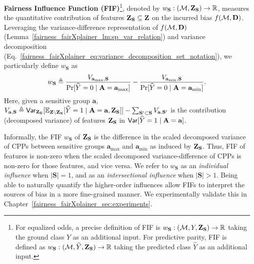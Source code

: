\begin{definition} \textbf{Fairness Influence Function (FIF)}\footnote{For equalized odds, a precise definition of FIF is $ w_{\mathbf{S}}: (\mathcal{M}, Y, \mathbf{Z}_{\mathbf{S}}) \rightarrow \mathbb{R} $ taking the ground class $ Y $ as an additional input. For predictive parity, FIF is defined as $ w_{\mathbf{S}}: (\mathcal{M}, \widehat{Y}, \mathbf{Z}_{\mathbf{S}}) \rightarrow \mathbb{R} $ taking the predicted class $ \widehat{Y} $ as an additional input.}, denoted by $ w_{\mathbf{S}}: (\mathcal{M}, \mathbf{Z}_{\mathbf{S}}) \rightarrow \mathbb{R} $, measures the quantitative contribution of features $ \mathbf{Z}_{\mathbf{S}} \subseteq \mathbf{Z} $ on the incurred bias $ f(\mathcal{M}, \mathbf{D}) $. Leveraging the variance-difference representation of $ f(\mathcal{M}, \mathbf{D}) $ (Lemma~\ref{fairness_fairXplainer_lm:sp_var_relation}) and variance decomposition (Eq.~\eqref{fairness_fairXplainer_eq:variance_decomposition_set_notation}), we particularly define $ w_{\mathbf{S}} $ as
\begin{equation}\label{fairness_fairXplainer_eq:fif_decompose}
	w_{\mathbf{S}}  \triangleq \frac{V_{\mathbf{a}_{\max}, \mathbf{S}}}{ \Pr[\widehat{Y} = 0 \mid  \mathbf{A} = \mathbf{a}_{\max}]} - \frac{V_{\mathbf{a}_{\min}, \mathbf{S}} }{\Pr[\widehat{Y} = 0 \mid  \mathbf{A} = \mathbf{a}_{\min}]}.
\end{equation}
Here, given a sensitive group $ \mathbf{a} $, $ V_{\mathbf{a}, \mathbf{S}} \triangleq  \mathsf{Var} _{\mathbf{Z}_{\mathbf{S}}}[\mathbb{E}_{\mathbf{Z}\setminus\mathbf{Z}_{\mathbf{S}}}[\widehat{Y} = 1\mid \mathbf{A} = \mathbf{a}, \mathbf{Z}_{\mathbf{S}}]]- \sum_{\mathbf{S}' \subset \mathbf{S}}{V} _{\mathbf{a}, \mathbf{S}'} $ is the contribution (decomposed variance) of features $ \mathbf{Z}_{\mathbf{S}} $ in $ \mathsf{Var}[\widehat{Y} = 1\mid\mathbf{A} = \mathbf{a}] $.
\end{definition}	

Informally, the FIF $ w_{\mathbf{S}} $ of $ \mathbf{Z}_{\mathbf{S}} $ is the difference in the scaled decomposed variance of CPPs between sensitive groups $ \mathbf{a}_{\max} $ and $ \mathbf{a}_{\min} $ as induced by  $ \mathbf{Z}_{\mathbf{S}} $. Thus, FIF of features is non-zero when the scaled decomposed variance-difference of CPPs is non-zero for those features, and vice versa. We refer to $ w_{\mathbf{S}} $ as an \emph{individual influence} when $ |\mathbf{S}| = 1 $, and as an \emph{intersectional influence} when $ |\mathbf{S}| > 1 $. Being able to naturally quantify the higher-order influences allow FIFs to interpret the sources of bias in a more fine-grained manner. We experimentally validate this in Chapter~\ref{fairness_fairXplainer_sec:experiments}.
 


